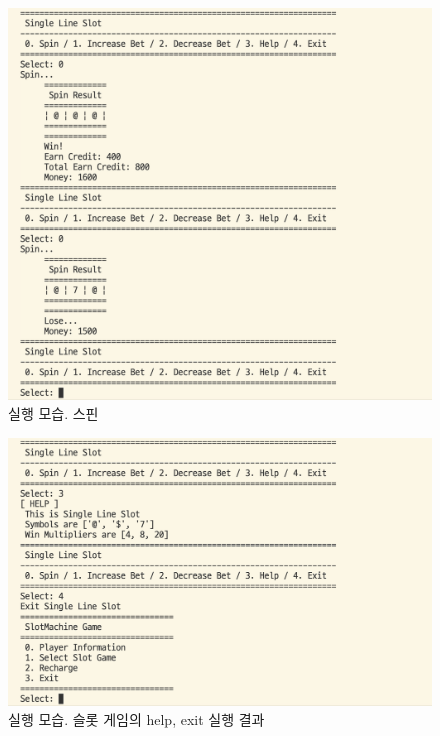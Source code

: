 \documentclass{article}
\begin{document}
\begin{figure}
  \includegraphics[width=\textwidth]{assets/screenshots/3.png}
  \caption{실행 모습. 스핀}
  \label{img:3}
\end{figure}
\begin{figure}
  \includegraphics[width=\textwidth]{assets/screenshots/4.png}
  \caption{실행 모습. 슬롯 게임의 help, exit 실행 결과}
  \label{img:4}
\end{figure}
\end{document}

